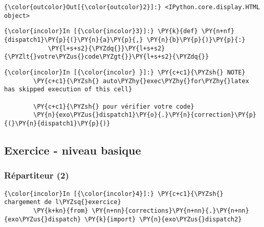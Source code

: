 \begin{Verbatim}[commandchars=\\\{\},frame=single,framerule=0.3mm,rulecolor=\color{cellframecolor}]
{\color{outcolor}Out[{\color{outcolor}2}]:} <IPython.core.display.HTML object>
\end{Verbatim}
            
    \begin{Verbatim}[commandchars=\\\{\},frame=single,framerule=0.3mm,rulecolor=\color{cellframecolor}]
{\color{incolor}In [{\color{incolor}3}]:} \PY{k}{def} \PY{n+nf}{dispatch1}\PY{p}{(}\PY{n}{a}\PY{p}{,} \PY{n}{b}\PY{p}{)}\PY{p}{:}
            \PY{l+s+s2}{\PYZdq{}}\PY{l+s+s2}{\PYZlt{}votre\PYZus{}code\PYZgt{}}\PY{l+s+s2}{\PYZdq{}}
\end{Verbatim}


    \begin{Verbatim}[commandchars=\\\{\},frame=single,framerule=0.3mm,rulecolor=\color{cellframecolor}]
{\color{incolor}In [{\color{incolor} }]:} \PY{c+c1}{\PYZsh{} NOTE}
        \PY{c+c1}{\PYZsh{} auto\PYZhy{}exec\PYZhy{}for\PYZhy{}latex has skipped execution of this cell}
        
        \PY{c+c1}{\PYZsh{} pour vérifier votre code}
        \PY{n}{exo\PYZus{}dispatch1}\PY{o}{.}\PY{n}{correction}\PY{p}{(}\PY{n}{dispatch1}\PY{p}{)}
\end{Verbatim}


    \hypertarget{exercice---niveau-basique}{%
\subsection{Exercice - niveau basique}\label{exercice---niveau-basique}}

    \hypertarget{ruxe9partiteur-2}{%
\subsubsection{Répartiteur (2)}\label{ruxe9partiteur-2}}

    \begin{Verbatim}[commandchars=\\\{\},frame=single,framerule=0.3mm,rulecolor=\color{cellframecolor}]
{\color{incolor}In [{\color{incolor}4}]:} \PY{c+c1}{\PYZsh{} chargement de l\PYZsq{}exercice}
        \PY{k+kn}{from} \PY{n+nn}{corrections}\PY{n+nn}{.}\PY{n+nn}{exo\PYZus{}dispatch} \PY{k}{import} \PY{n}{exo\PYZus{}dispatch2}
\end{Verbatim}



